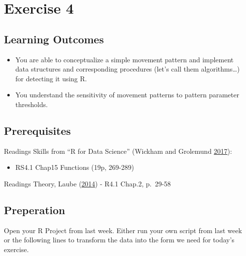 \documentclass[]{book}
\newenvironment{Shaded}{\begin{snugshade}}{\end{snugshade}}
\newcommand{\KeywordTok}[1]{\textcolor[rgb]{0.13,0.29,0.53}{\textbf{#1}}}
\newcommand{\DecValTok}[1]{\textcolor[rgb]{0.00,0.00,0.81}{#1}}
\newcommand{\NormalTok}[1]{#1}
\providecommand{\tightlist}{%
  \setlength{\itemsep}{0pt}\setlength{\parskip}{0pt}}
\begin{document}
\begin{Shaded}
\begin{Highlighting}[]
{{{{{{\KeywordTok{nrow}\NormalTok{(caro60)}
\KeywordTok{nrow}\NormalTok{(caro60_}\DecValTok{3}\NormalTok{)}
\KeywordTok{nrow}\NormalTok{(caro60_}\DecValTok{6}\NormalTok{)}
\KeywordTok{nrow}\NormalTok{(caro60_}\DecValTok{9}\NormalTok{)}
\end{Highlighting}
\end{Shaded}

\chapter{Exercise 4}\label{exercise-4}

\section{Learning Outcomes}\label{learning-outcomes-2}

\begin{itemize}
\tightlist
\item
  You are able to conceptualize a simple movement pattern and implement
  data structures and corresponding procedures (let's call them
  algorithms\ldots{}) for detecting it using R.
\item
  You understand the sensitivity of movement patterns to pattern
  parameter thresholds.
\end{itemize}

\section{Prerequisites}\label{prerequisites-3}

Readings Skills from ``R for Data Science'' (Wickham and Grolemund
\protect\hyperlink{ref-wickham2017}{2017}):

\begin{itemize}
\tightlist
\item
  RS4.1 Chap15 Functions (19p, 269-289)
\end{itemize}

Readings Theory, Laube (\protect\hyperlink{ref-laube2014}{2014}) - R4.1
Chap.2, p.~29-58

\section{Preperation}\label{preperation-6}

Open your R Project from last week. Either run your own script from last
week or the following lines to transform the data into the form we need
for today's exercise.
\end{document}
